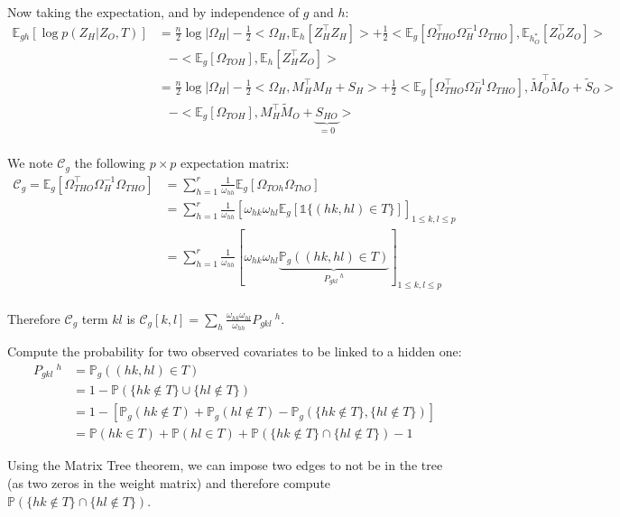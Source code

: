 \documentclass[11pt,a4paper]{article}
\newcommand{\Esp}{\mathds{E}}
\begin{document}
Now taking the expectation, and by independence of $g$ and $h$:
\begin{align*}
\Esp_{gh}[\log p(Z_H | Z_O,T) ] &=\frac{n}{2} \log |\Omega_H| -\frac{1}{2} <\Omega_H,\Esp_h[Z_H^\intercal Z_H]> +\frac{1}{2} <\Esp_g[\Omega_{THO}^\intercal \Omega_H^{-1}\Omega_{THO}],\Esp_{h_O^*}[Z_O^\intercal Z_O]> \\
&\;\;\; -<\Esp_g[\Omega_{TOH}],\Esp_h[Z_H^\intercal Z_O]>\\
&=\frac{n}{2} \log |\Omega_H|-\frac{1}{2} <\Omega_H,M_H^\intercal M_H + S_H> +\frac{1}{2} <\Esp_g[\Omega_{THO}^\intercal \Omega_H^{-1}\Omega_{THO}],\widetilde{M}_O^\intercal \widetilde{M}_O + \widetilde{S}_O>\\
&\;\;\; -<\Esp_g[\Omega_{TOH}],M_H^\intercal \widetilde{M}_O +  \underbrace{S_{HO}}_{=0}>
\end{align*}\\



We note $\mathcal{C}_g$ the following $p \times p$ expectation matrix:
\begin{align*}
\mathcal{C}_g=\Esp_g[\Omega_{THO}^\intercal \Omega_H^{-1}\Omega_{THO}] &= \sum_{h=1}^r \frac{1}{\omega_{hh}} \Esp_g[\Omega_{TOh} \Omega_{ThO}]\\
&= \sum_{h=1}^r \frac{1}{\omega_{hh}} \left[ \omega_{hk}\omega_{hl}\Esp_g[\mathds{1}\{(hk,hl)\in T\}]\right]_{1\leq k,l\leq p}\\
&=\sum_{h=1}^r \frac{1}{\omega_{hh}}[ \omega_{hk}\omega_{hl}\underbrace{\mathds{P}_g((hk,hl)\in T)}_{P_{gkl}\:^h}]_{1\leq k,l\leq p}
\end{align*}\\
Therefore $\mathcal{C}_g$ term $kl$ is $\mathcal{C}_g[k,l] = \sum_h \frac{\omega_{hk}\omega_{hl}}{\omega_{hh}} P_{gkl}\:^h$.


Compute the probability for two observed covariates to be linked to a hidden one:
\begin{align*}
P_{gkl}\:^h&=\mathds{P}_g((hk,hl)\in T)\\
&=1- \mathds{P}(\{hk \notin T\} \cup \{hl \notin T\})\\
&= 1 - \left[ \mathds{P}_g(hk \notin T)+ \mathds{P}_g(hl \notin T) - \mathds{P}_g( \{hk \notin T\}, \{hl \notin T\}) \right]\\
&=\mathds{P}(hk \in T) + \mathds{P}(hl \in T) + \mathds{P}(\{hk \notin T\} \cap \{hl \notin T\})-1
\end{align*}

Using the Matrix Tree theorem, we can impose two edges to not be in the tree (as two zeros in the weight matrix) and therefore compute $ \mathds{P}(\{hk \notin T\} \cap \{hl \notin T\})$.\\
\end{document}
